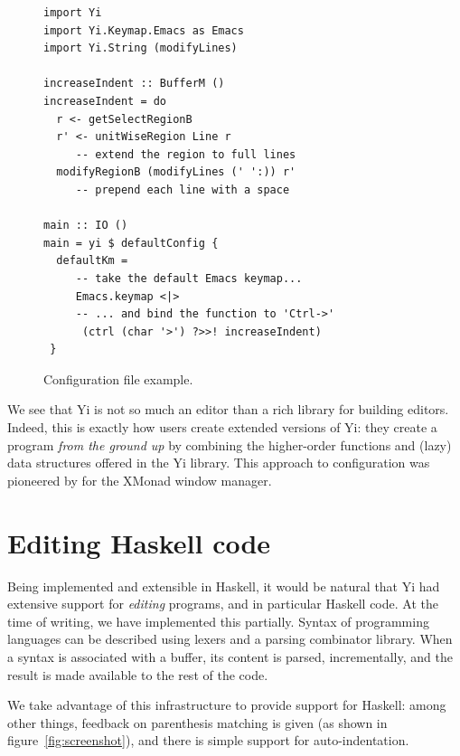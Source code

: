 \documentclass[9pt,indentedstyle,preprint]{sigplanconf}
\begin{document}
\begin{figure}
\begin{verbatim}
import Yi
import Yi.Keymap.Emacs as Emacs
import Yi.String (modifyLines)

increaseIndent :: BufferM ()
increaseIndent = do
  r <- getSelectRegionB 
  r' <- unitWiseRegion Line r 
     -- extend the region to full lines
  modifyRegionB (modifyLines (' ':)) r'
     -- prepend each line with a space
                                     
main :: IO ()
main = yi $ defaultConfig {
  defaultKm = 
     -- take the default Emacs keymap...
     Emacs.keymap <|> 
     -- ... and bind the function to 'Ctrl->'
      (ctrl (char '>') ?>>! increaseIndent)
 }
\end{verbatim}
\caption{Configuration file example.}
\label{fig:example}
\end{figure}

We see that Yi is not so much an editor than a rich library for
building editors. Indeed, this is exactly how users create extended
versions of Yi: they create a program {\em from the ground up} by
combining the higher-order functions and (lazy) data structures
offered in the Yi library. This approach to configuration was
pioneered by \citet{Stewart2007XMonad} for the XMonad window manager.

\section{Editing Haskell code}

Being implemented and extensible in Haskell, it would be natural that
Yi had extensive support for \emph{editing} programs, and in
particular Haskell code.  At the time of writing, we have implemented
this partially. Syntax of programming languages can be described
using lexers and a parsing combinator library. When a syntax is
associated with a buffer, its content is parsed, incrementally,
and the result is made available to the rest of the code.

We take advantage of this infrastructure to provide support for
Haskell: among other things, feedback on parenthesis matching is given
(as shown in figure~\ref{fig:screenshot}), and there is simple support
for auto-indentation.
\end{document}

